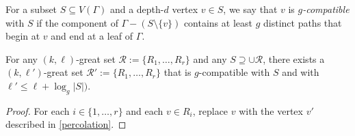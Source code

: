 \documentclass{patmorin}
\newcommand{\defin}[1]{\emph{\color{brightmaroon}#1}}
\begin{document}
For a subset $S\subseteq V(\Gamma)$ and a depth-$d$ vertex $v\in S$, we say that $v$ is \defin{$g$-compatible} with $S$ if the component of $\Gamma-(S\setminus\{v\})$ contains at least $g$ distinct paths that begin at $v$ and end at a leaf of $\Gamma$.  

\begin{lem}\label{compatible_set}
  For any $(k,\ell)$-great set $\mathcal{R}:=\{R_1,\ldots,R_r\}$ and any $S\supseteq \cup\mathcal{R}$, there exists a $(k,\ell')$-great set $\mathcal{R}':=\{R_1,\ldots,R_r\}$ that is $g$-compatible with $S$ and with $\ell'\le \ell+\log_g|S|)$.
\end{lem}

\begin{proof}
  For each $i\in\{1,\ldots,r\}$ and each $v\in R_i$, replace $v$ with the vertex $v'$ described in \cref{percolation}.
\end{proof}


\end{document}
